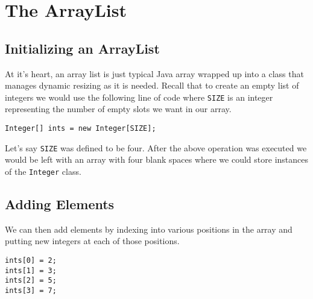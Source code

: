 \documentclass[a4paper]{article}
\begin{document}
\section*{The ArrayList}

\subsection*{Initializing an ArrayList}
At it's heart, an array list is just typical Java array wrapped up into a class
that manages dynamic resizing as it is needed. Recall that to create an empty
list of integers we would use the following line of code where \lstinline|SIZE|
is an integer representing the number of empty slots we want in our array.\\

\begin{lstlisting}[frame=trBL]
Integer[] ints = new Integer[SIZE];
\end{lstlisting}

Let's say \lstinline|SIZE| was defined to be four. After the above operation
was executed we would be left with an array with four blank spaces where we 
could store instances of the \lstinline|Integer| class.\\
\begin{figure}[H]
	\centering
\end{figure}

\subsection*{Adding Elements}
We can then add elements by indexing into various positions in the array and 
putting new integers at each of those positions.\\

\begin{minipage}{0.45\textwidth}
\begin{lstlisting}[frame=trBL]
ints[0] = 2;
ints[1] = 3;
ints[2] = 5;
ints[3] = 7;
\end{lstlisting}
\end{minipage}
\hfill
\begin{minipage}{0.45\textwidth}
\begin{figure}[H]
	\centering
	\vspace{1.0cm}
\end{figure}
\end{minipage}
\end{document}
